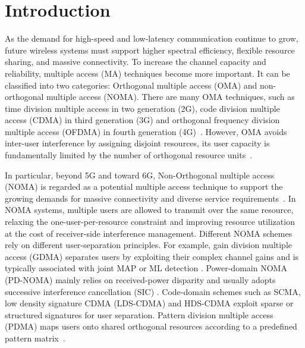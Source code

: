 
\chapter{Introduction}


As the demand for high-speed and low-latency communication continue to grow, future wireless systems must support higher spectral efficiency, flexible resource sharing, and massive connectivity. To increase the channel capacity and reliability, multiple access (MA) techniques become more important. 
It can be classified into two categories: Orthogonal multiple access (OMA) and non-orthogonal multiple access (NOMA).
There are many OMA techniques, such as time division multiple access in two generation (2G), code division multiple access (CDMA) in third generation (3G) and orthogonal frequency division multiple access (OFDMA) in fourth generation (4G)~\cite{cai2017modulationmultipleaccess5g, navita2016performance}.
However, OMA avoids inter-user interference by assigning disjoint resources, its user capacity is fundamentally limited by the number of orthogonal resource units~\cite{dai2018survey}. 

In particular, beyond 5G and toward 6G, Non-Orthogonal multiple access (NOMA) is regarded as a potential multiple access technique to support the growing demands for massive connectivity and diverse service requirements~\cite{clerckx2024multiple}.
In NOMA systems, multiple users are allowed to transmit over the same resource, relaxing the one-user-per-resource constraint and improving resource utilization at the cost of receiver-side interference management. 
Different NOMA schemes rely on different user-separation principles. For example, gain division multiple access (GDMA) separates users by exploiting their complex channel gains and is typically associated with joint MAP or ML detection \cite{hsu2019gain}. 
Power-domain NOMA (PD-NOMA) mainly relies on received-power disparity and usually adopts successive interference cancellation (SIC) \cite{islam2016power, dai2018survey}. 
Code-domain schemes such as SCMA, low density signature CDMA (LDS-CDMA) and HDS-CDMA exploit sparse or structured signatures for user separation\cite{nikopour2013sparse,lin2023gdma}. 
Pattern division multiple access (PDMA) maps users onto shared orthogonal resources according to a predefined pattern matrix~\cite{kong2016multiuser}.

